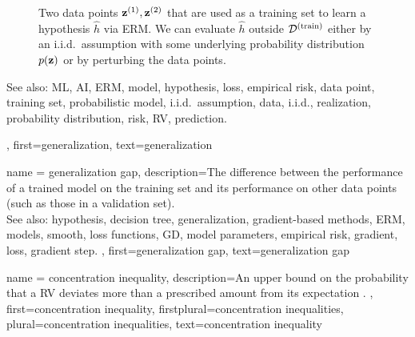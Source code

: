 {{\begin{figure}[H]
		                   	\caption{Two data points ${\bf z}^{(1)},{\bf z}^{(2)}$ that are used as a training set 
		                   		to learn a hypothesis $\hat{h}$ via ERM. We can evaluate $\hat{h}$ 
		                   		outside $\mathcal{D}^{(\rm train)}$ either by an i.i.d.\ assumption with some underlying probability distribution $p({\bf z})$ 
		                   		or by perturbing the data points.}
		                   	\label{fig:polynomial_fit_dict}
		                   \end{figure}
		See also: ML, AI, ERM, model, hypothesis, loss, empirical risk, data point, training set, probabilistic model, i.i.d.\ assumption, data, i.i.d., realization, probability distribution, risk, RV, prediction.
		},
	first={generalization},
	text={generalization} 
}

{name = {generalization gap}, 
	description={The difference between the performance of a trained model 
		on the training set and its performance on other data points (such as those in a validation set). 
		\\
		See also: hypothesis, decision tree, generalization, gradient-based methods, ERM, models, smooth, loss functions, GD, model parameters, empirical risk, gradient, loss, gradient step.
	}, 
	first={generalization gap}, 
	text={generalization gap}} 
	
{name = {concentration inequality}, 
	description={An upper bound on the probability that a RV deviates 
		more than a prescribed amount from its expectation \cite{Wain2019}. 
	}, 
	first={concentration inequality},
	firstplural={concentration inequalities},  
	plural={concentration inequalities},  
	text={concentration inequality}} 




